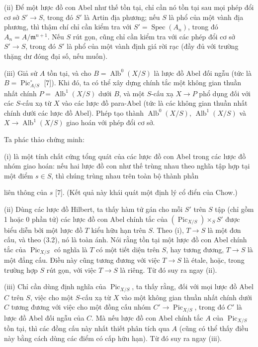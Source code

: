 \documentclass[11pt,twoside,openany]{book}
\numberwithin{equation}{section}
\newcommand{\src}[1]{%
  \phantomsection\hypertarget{src:\fgasourceid:#1}{}%
  \marginpar{\raggedleft\footnotesize\sffamily #1}%
}
\newcommand{\fgasourceid}{unset}
\begin{document}
\noindent(ii) Để một lược đồ con Abel như thế tồn tại, chỉ cần nó tồn tại sau
mọi phép đổi cơ sở $S'\longrightarrow S$, trong đó $S'$ là Artin địa phương;
nếu $S$ là phổ của một vành địa phương, thì thậm chí chỉ cần kiểm tra với
$S'=\operatorname{Spec}(A_n)$, trong đó
$A_n=A/\mathfrak m^{n+1}$. Nếu $S$ rút gọn, cũng chỉ cần kiểm tra với các phép
đổi cơ sở $S'\longrightarrow S$, trong đó $S'$ là phổ của một vành định giá
rời rạc (đầy đủ với trường thặng dư đóng đại số, nếu muốn).

\noindent(iii) Giả sử $A$ tồn tại, và cho
$B=\operatorname{Alb}^0(X/S)$ là lược đồ Abel đối ngẫu (tức là
$B=\operatorname{Pic}_{A/S}^\circ$ [7]). Khi đó, ta có thể xây dựng chính tắc
một không gian thuần nhất chính $P=\operatorname{Alb}^1(X/S)$ dưới $B$, và
một $S$-cấu xạ $X\longrightarrow P$ phổ dụng đối với các $S$-cấu xạ từ $X$
vào các lược đồ para-Abel (tức là các không gian thuần nhất chính dưới các
lược đồ Abel). Phép tạo thành $\operatorname{Alb}^0(X/S)$,
$\operatorname{Alb}^1(X/S)$ và
$X\longrightarrow\operatorname{Alb}^1(X/S)$ giao hoán với phép đổi cơ sở.

Ta phác thảo chứng minh:

(i) là một tính chất cứng tổng quát của các lược đồ con Abel trong các lược đồ
nhóm giao hoán: nếu hai lược đồ con như thế trùng nhau theo nghĩa tập hợp tại
một điểm $s\in S$, thì chúng trùng nhau trên toàn bộ thành phần
\src{238}
liên thông của $s$ [7]. (Kết quả này khái quát một định lý cổ điển của Chow.)

(ii) Dùng các lược đồ Hilbert, ta thấy hàm tử gán cho mỗi $S'$ trên $S$ tập
(chỉ gồm 1 hoặc 0 phần tử) các lược đồ con Abel chính tắc của
$(\operatorname{Pic}_{X/S})\times_S S'$ được biểu diễn bởi một lược đồ $T$
kiểu hữu hạn trên $S$. Theo (i), $T\longrightarrow S$ là một đơn cấu, và theo
(3.2), nó là toàn ánh. Nói rằng tồn tại một lược đồ con Abel chính tắc của
$\operatorname{Pic}_{X/S}$ có nghĩa là $T$ có một tiết diện trên $S$, hay
tương đương, $T\longrightarrow S$ là một đẳng cấu. Điều này cũng tương đương
với việc $T\longrightarrow S$ là étale, hoặc, trong trường hợp $S$ rút gọn,
với việc $T\longrightarrow S$ là riêng. Từ đó suy ra ngay (ii).

(iii) Chỉ cần dùng định nghĩa của $\operatorname{Pic}_{X/S}$, ta thấy rằng,
đối với mọi lược đồ Abel $C$ trên $S$, việc cho một $S$-cấu xạ từ $X$ vào một
không gian thuần nhất chính dưới $C$ tương đương với việc cho một đồng cấu nhóm
$C'\longrightarrow\operatorname{Pic}_{X/S}$, trong đó $C'$ là lược đồ Abel
đối ngẫu của $C$. Mà nếu lược đồ con Abel chính tắc $A$ của
$\operatorname{Pic}_{X/S}$ tồn tại, thì các đồng cấu này nhất thiết phân tích
qua $A$ (cũng có thể thấy điều này bằng cách dùng các điểm có cấp hữu hạn). Từ
đó suy ra ngay (iii).
\end{document}
